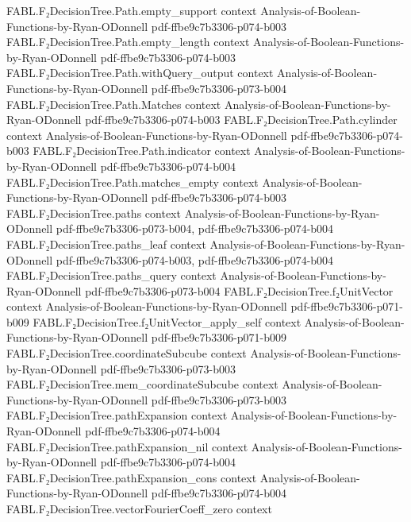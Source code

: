 \begin{theorem}
\proofstep
  {FABL.F₂DecisionTree.Path.empty_support}
  {context}
  {Analysis-of-Boolean-Functions-by-Ryan-ODonnell}
  {pdf-ffbe9c7b3306-p074-b003}
\proofstep
  {FABL.F₂DecisionTree.Path.empty_length}
  {context}
  {Analysis-of-Boolean-Functions-by-Ryan-ODonnell}
  {pdf-ffbe9c7b3306-p074-b003}
\proofstep
  {FABL.F₂DecisionTree.Path.withQuery_output}
  {context}
  {Analysis-of-Boolean-Functions-by-Ryan-ODonnell}
  {pdf-ffbe9c7b3306-p073-b004}
\proofstep
  {FABL.F₂DecisionTree.Path.Matches}
  {context}
  {Analysis-of-Boolean-Functions-by-Ryan-ODonnell}
  {pdf-ffbe9c7b3306-p074-b003}
\proofstep
  {FABL.F₂DecisionTree.Path.cylinder}
  {context}
  {Analysis-of-Boolean-Functions-by-Ryan-ODonnell}
  {pdf-ffbe9c7b3306-p074-b003}
\proofstep
  {FABL.F₂DecisionTree.Path.indicator}
  {context}
  {Analysis-of-Boolean-Functions-by-Ryan-ODonnell}
  {pdf-ffbe9c7b3306-p074-b004}
\proofstep
  {FABL.F₂DecisionTree.Path.matches_empty}
  {context}
  {Analysis-of-Boolean-Functions-by-Ryan-ODonnell}
  {pdf-ffbe9c7b3306-p074-b003}
\proofstep
  {FABL.F₂DecisionTree.paths}
  {context}
  {Analysis-of-Boolean-Functions-by-Ryan-ODonnell}
  {pdf-ffbe9c7b3306-p073-b004,
    pdf-ffbe9c7b3306-p074-b004}
\proofstep
  {FABL.F₂DecisionTree.paths_leaf}
  {context}
  {Analysis-of-Boolean-Functions-by-Ryan-ODonnell}
  {pdf-ffbe9c7b3306-p074-b003,
    pdf-ffbe9c7b3306-p074-b004}
\proofstep
  {FABL.F₂DecisionTree.paths_query}
  {context}
  {Analysis-of-Boolean-Functions-by-Ryan-ODonnell}
  {pdf-ffbe9c7b3306-p073-b004}
\proofstep
  {FABL.F₂DecisionTree.f₂UnitVector}
  {context}
  {Analysis-of-Boolean-Functions-by-Ryan-ODonnell}
  {pdf-ffbe9c7b3306-p071-b009}
\proofstep
  {FABL.F₂DecisionTree.f₂UnitVector_apply_self}
  {context}
  {Analysis-of-Boolean-Functions-by-Ryan-ODonnell}
  {pdf-ffbe9c7b3306-p071-b009}
\proofstep
  {FABL.F₂DecisionTree.coordinateSubcube}
  {context}
  {Analysis-of-Boolean-Functions-by-Ryan-ODonnell}
  {pdf-ffbe9c7b3306-p073-b003}
\proofstep
  {FABL.F₂DecisionTree.mem_coordinateSubcube}
  {context}
  {Analysis-of-Boolean-Functions-by-Ryan-ODonnell}
  {pdf-ffbe9c7b3306-p073-b003}
\proofstep
  {FABL.F₂DecisionTree.pathExpansion}
  {context}
  {Analysis-of-Boolean-Functions-by-Ryan-ODonnell}
  {pdf-ffbe9c7b3306-p074-b004}
\proofstep
  {FABL.F₂DecisionTree.pathExpansion_nil}
  {context}
  {Analysis-of-Boolean-Functions-by-Ryan-ODonnell}
  {pdf-ffbe9c7b3306-p074-b004}
\proofstep
  {FABL.F₂DecisionTree.pathExpansion_cons}
  {context}
  {Analysis-of-Boolean-Functions-by-Ryan-ODonnell}
  {pdf-ffbe9c7b3306-p074-b004}
\proofstep
  {FABL.F₂DecisionTree.vectorFourierCoeff_zero}
  {context}

\end{theorem}
